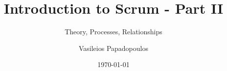 \documentclass[aspectratio=169,xcolor=dvipsnames]{beamer}
\title[Introduction to Scrum - Part II]{Introduction to Scrum - Part II}
\subtitle{Theory, Processes, Relationships}
\author{Vasileios Papadopoulos}
\institute[]{}
\date{\today}
\begin{document}
    \begin{frame}
    	\titlepage
    \end{frame}

    

    

    

    

    
\end{document}
